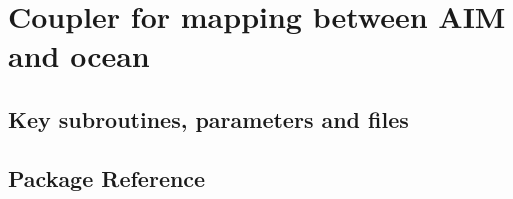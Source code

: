 \section{Coupler for mapping between AIM and ocean }
\label{sec:aim_ocn_coupler}
\subsection{Key subroutines, parameters and files}
\label{sec:pkg:aim_ocn_coupler:implementation_synopsis}
\subsection{Package Reference}
